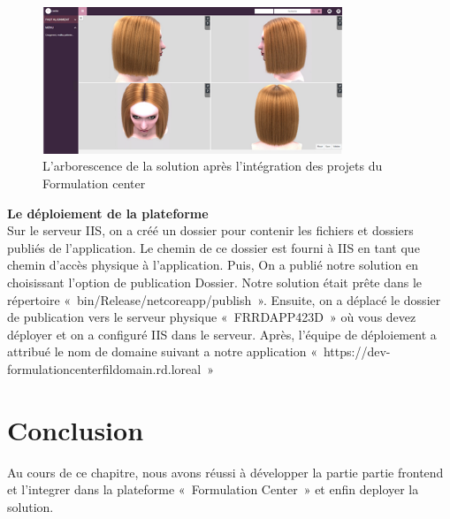 \begin{figure}[!ht]\centering
\includegraphics[width=0.8\textwidth]{chapitres/chapitre5/figures/IntegrationFC.png}
\caption{L’arborescence de la solution après l’intégration des projets du Formulation center }
\label{fig:arbo}
\end{figure}

\newpage
\textbf{Le déploiement de la plateforme}
\\
Sur le serveur IIS, on a créé un dossier pour contenir les fichiers et dossiers publiés de l’application. Le chemin de ce dossier est fourni à IIS en tant que chemin d’accès physique à l’application. Puis, On a publié notre solution en choisissant l’option de publication Dossier. Notre solution était prête dans le répertoire « bin/Release/netcoreapp/publish ». Ensuite, on a déplacé le dossier de publication vers le serveur physique « FRRDAPP423D » où vous devez déployer et on a configuré IIS dans le serveur. Après, l’équipe de déploiement a attribué le nom de domaine suivant a notre application « https://dev-formulationcenterfildomain.rd.loreal »



\section*{Conclusion}
Au cours de ce chapitre, nous avons réussi à développer la partie partie frontend et l'integrer dans la plateforme « Formulation Center » et enfin deployer la solution.
